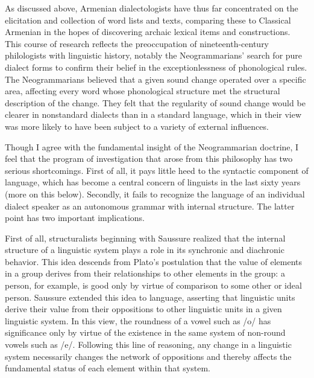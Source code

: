 \documentclass[output=paper]{langscibook}
\begin{document}
As discussed above, Armenian dialectologists have thus far concentrated on the elicitation and collection of word lists and texts, comparing these to Classical Armenian in the hopes of discovering archaic lexical items and constructions. This course of research reflects the preoccupation of nineteenth-century philologists with linguistic history, notably the Neogrammarians' search for pure dialect forms to confirm their belief in the exceptionlessness of phonological rules. The Neogrammarians believed that a given sound change operated over a specific area, affecting every word whose phonological structure met the structural description of the change. They felt that the regularity of sound change would be clearer in nonstandard dialects than in a standard language, which in their view was more likely to have been subject to a variety of external influences. 

Though I agree with the fundamental insight of the Neogrammarian doctrine, I feel that the program of investigation that arose from this philosophy has two serious shortcomings. First of all, it pays little heed to the syntactic component of language, which has become a central concern of linguists in the last sixty years (more on this below). Secondly, it fails to recognize the language of an individual dialect speaker as an autonomous grammar with internal structure. The latter point has two important implications.

First of all, structuralists beginning with Saussure realized that the internal structure of a linguistic system plays a role in its synchronic and diachronic behavior. This idea descends from Plato's postulation that the value of elements in a group derives from their relationships to other elements in the group: a person, for example, is good only by virtue of comparison to some other or ideal person. Saussure extended this idea to language, asserting that linguistic units derive their value from their oppositions to other linguistic units in a given linguistic system. In this view, the roundness of a vowel such as /o/ has significance only by virtue of the existence in the same system of non-round vowels such as /e/. Following this line of reasoning, any change in a linguistic system necessarily changes the network of oppositions and thereby affects the fundamental status of each element within that system.
\end{document}

